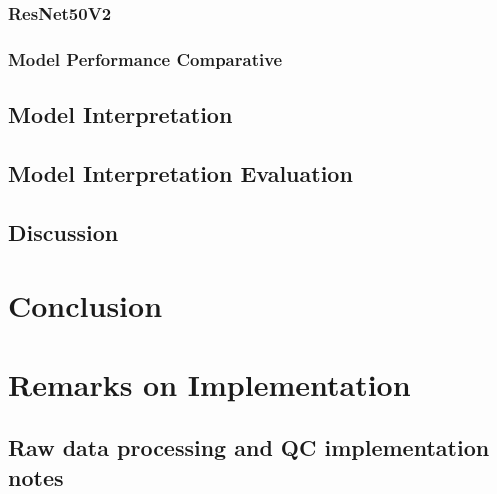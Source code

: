 \documentclass[biblatexBackend=bibtex]{tumthesis}
\begin{document}
\subsection{ResNet50V2}
\label{sec:results:RN50V2}

\subsection{Model Performance Comparative}
\label{sec:results:comparative}


\section{Model Interpretation}
\label{sec:results:model_interpretation}

\section{Model Interpretation Evaluation}
\label{sec:results:model_inter_eval}

\section{Discussion}

\chapter{Conclusion}
\label{ch:Conclusion}


\appendix

\chapter{Remarks on Implementation}
\label{Appendix-Implementation}


\section{Raw data processing and QC implementation notes}
\label{sec:appendix:raw_data}

\end{document}
